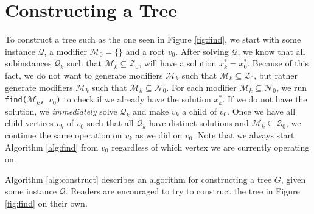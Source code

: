\section{Constructing a Tree}
\label{sec:construction}
To construct a tree such as the one seen in Figure \ref{fig:find}, we start
with some instance $\mathcal{Q}$, a modifier $\mathcal{M}_0 = \{ {} \}$ and
a root $v_0$. After solving $\mathcal{Q}$, we know that all subinstances
$\mathcal{Q}_k$ such that $\mathcal{M}_k \subseteq \mathcal{Z}_0$, will have
a solution $x_k^* = x_0^*$. Because of this fact, we do not want to generate
modifiers $\mathcal{M}_k$ such that $\mathcal{M}_k \subseteq \mathcal{Z}_0$,
but rather generate modifiers $\mathcal{M}_k$ such that $\mathcal{M}_k
\subseteq \mathcal{N}_0$.
For each modifier $\mathcal{M}_k \subseteq \mathcal{N}_0$, we run
\texttt{find($\mathcal{M}_k$, $v_0$)} to check if we already have the solution
$x_k^*$.
If we do not have the solution, we \emph{immediately} solve $\mathcal{Q}_k$
and make $v_k$ a child of $v_0$. Once we have all child vertices $v_k$ of $v_0$
such that all $\mathcal{Q}_k$ have distinct solutions and $\mathcal{M}_k
\subseteq \mathcal{Z}_0$, we continue the same operation on $v_k$ as we did
on $v_0$. Note that we always start Algorithm \ref{alg:find} from $v_0$
regardless of which vertex we are currently operating on.


Algorithm \ref{alg:construct} describes an algorithm for constructing a tree
$G$, given some instance $\mathcal{Q}$. Readers are encouraged to try to
construct the tree in Figure \ref{fig:find} on their own.
